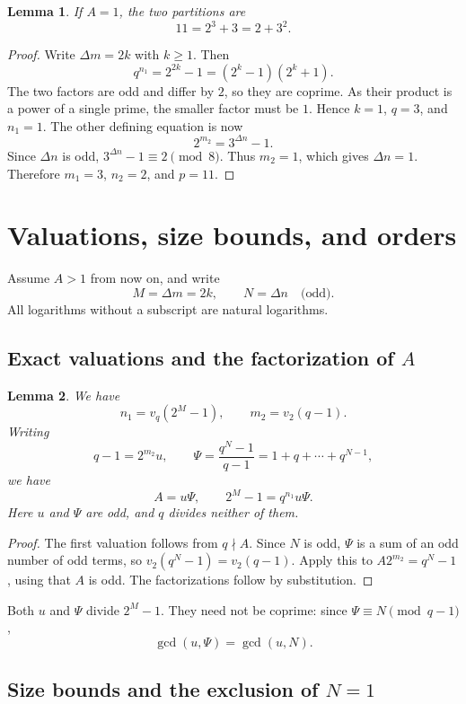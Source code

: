 \documentclass[11pt]{article}
\newtheorem{lemma}{Lemma}
\begin{document}
\begin{lemma}\label{lem:Aone}
If $A=1$, the two partitions are
\[
11=2^3+3=2+3^2.
\]
\end{lemma}
\begin{proof}
Write $\Delta m=2k$ with $k\geq1$. Then
\[
q^{n_1}=2^{2k}-1=(2^k-1)(2^k+1).
\]
The two factors are odd and differ by $2$, so they are coprime.
As their product is a power of a single prime, the smaller factor
must be $1$. Hence $k=1$, $q=3$, and $n_1=1$.
The other defining equation is now
\[
2^{m_2}=3^{\Delta n}-1.
\]
Since $\Delta n$ is odd, $3^{\Delta n}-1\equiv2\pmod8$.
Thus $m_2=1$, which gives $\Delta n=1$.
Therefore $m_1=3$, $n_2=2$, and $p=11$.
\end{proof}

\section{Valuations, size bounds, and orders}
\label{sec:bounds}

Assume $A>1$ from now on, and write
\[
M=\Delta m=2k,\qquad N=\Delta n\quad\text{(odd)}.
\]
All logarithms without a subscript are natural logarithms.

\subsection{\texorpdfstring{Exact valuations and the factorization of $A$}{Exact valuations and the factorization of A}}

\begin{lemma}\label{lem:valuations}
We have
\[
n_1=v_q(2^M-1),\qquad m_2=v_2(q-1).
\]
Writing
\[
q-1=2^{m_2}u,\qquad
\Psi=\frac{q^N-1}{q-1}=1+q+\cdots+q^{N-1},
\]
we have
\[
\boxed{A=u\Psi,\qquad 2^M-1=q^{n_1}u\Psi.}
\]
Here $u$ and $\Psi$ are odd, and $q$ divides neither of them.
\end{lemma}
\begin{proof}
The first valuation follows from $q\nmid A$.
Since $N$ is odd, $\Psi$ is a sum of an odd number of odd terms,
so $v_2(q^N-1)=v_2(q-1)$.
Apply this to $A2^{m_2}=q^N-1$, using that $A$ is odd.
The factorizations follow by substitution.
\end{proof}

Both $u$ and $\Psi$ divide $2^M-1$. They need not be coprime:
since $\Psi\equiv N\pmod{q-1}$,
\[
\gcd(u,\Psi)=\gcd(u,N).
\]
\subsection{\texorpdfstring{Size bounds and the exclusion of $N=1$}{Size bounds and the exclusion of N=1}}
\end{document}
